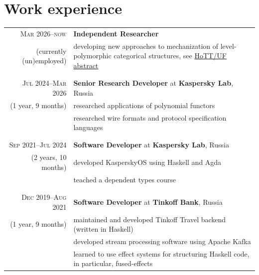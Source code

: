 \documentclass[a4paper,11pt]{article}
\begin{document}
  \pagebreak
  \section{Work experience}
    \begin{longtable}{r|p{}}
      \textsc{Mar 2026--now} & \large \sffamily \textbf{Independent Researcher}                                                   \\
      \nopagebreak
      (currently (un)employed) & developing new approaches to mechanization of level-polymorphic categorical structures,
                                 see \href{https://hott-uf.github.io/2026/abstracts/HoTTUF_2026_paper_10.pdf}{HoTT/UF abstract}   \\
      \\&\\
      \textsc{Jul 2024--Mar 2026} & \large \sffamily \textbf{Senior Research Developer} at \textbf{Kaspersky Lab}, Russia   \\
      \nopagebreak
      (1 year, 9 months) & researched applications of polynomial functors                                                   \\
                         & researched wire formats and protocol specification languages                                     \\
      \\&\\
      \textsc{Sep 2021--Jul 2024} & \large \sffamily \textbf{Software Developer} at \textbf{Kaspersky Lab}, Russia   \\
      \nopagebreak
      (2 years, 10 months) & developed KasperskyOS using Haskell and Agda                                            \\
                           & teached a dependent types course                                                        \\
      \\&\\
      \textsc{Dec 2019--Aug 2021} & \large \sffamily \textbf{Software Developer} at \textbf{Tinkoff Bank}, Russia     \\
      \nopagebreak
      (1 year, 9 months) & maintained and developed Tinkoff Travel backend (written in Haskell)                       \\
                         & developed stream processing software using Apache Kafka                                    \\
                         & learned to use effect systems for structuring Haskell code, in particular, fused-effects   \\

\end{longtable}
\end{document}
